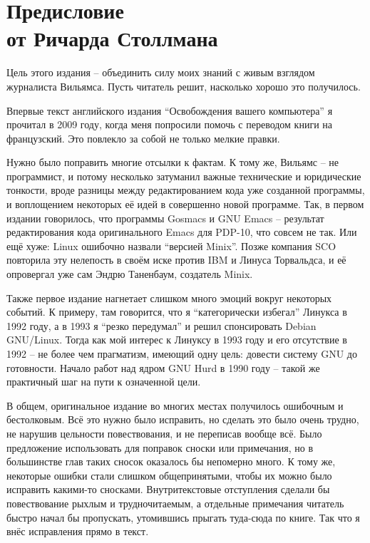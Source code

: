 
\chapter[Предисловие от Ричарда Столлмана]{Предисловие\\от Ричарда Столлмана}

Цель этого издания -- объединить силу моих знаний с живым взглядом журналиста Вильямса. Пусть читатель решит, насколько хорошо это получилось.

Впервые текст английского издания \enquote{Освобождения вашего компьютера} я прочитал в 2009 году, когда меня попросили помочь с переводом книги на французский. Это повлекло за собой не только мелкие правки.

Нужно было поправить многие отсылки к фактам. К тому же, Вильямс -- не программист, и потому несколько затуманил важные технические и юридические тонкости, вроде разницы между редактированием кода уже созданной программы, и воплощением некоторых её идей в совершенно новой программе. Так, в первом издании говорилось, что программы Gosmacs и GNU Emacs -- результат редактирования кода оригинального Emacs для PDP-10, что совсем не так. Или ещё хуже: Linux ошибочно назвали \enquote{версией Minix}. Позже компания SCO повторила эту нелепость в своём иске против IBM и Линуса Торвальдса, и её опровергал уже сам Эндрю Таненбаум, создатель Minix.

Также первое издание нагнетает слишком много эмоций вокруг некоторых событий. К примеру, там говорится, что я \enquote{категорически избегал} Линукса в 1992 году, а в 1993 я \enquote{резко передумал} и решил спонсировать Debian GNU/Linux. Тогда как мой интерес к Линуксу в 1993 году и его отсутствие в 1992 -- не более чем прагматизм, имеющий одну цель: довести систему GNU до готовности. Начало работ над ядром GNU Hurd в 1990 году -- такой же практичный шаг на пути к означенной цели.

В общем, оригинальное издание во многих местах получилось ошибочным и бестолковым. Всё это нужно было исправить, но сделать это было очень трудно, не нарушив цельности повествования, и не переписав вообще всё. Было предложение использовать для поправок сноски или примечания, но в большинстве глав таких сносок оказалось бы непомерно много. К тому же, некоторые ошибки стали слишком общепринятыми, чтобы их можно было исправить какими-то сносками. Внутритекстовые отступления сделали бы повествование рыхлым и трудночитаемым, а отдельные примечания читатель быстро начал бы пропускать, утомившись прыгать туда-сюда по книге. Так что я внёс исправления прямо в текст.

